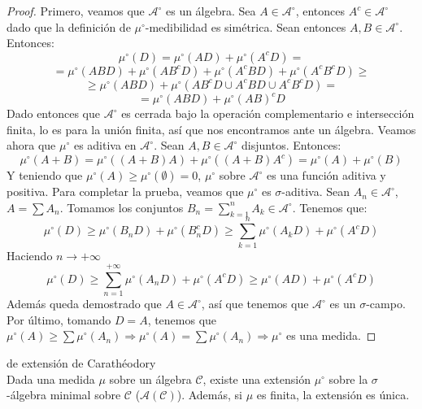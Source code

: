 \begin{proof}
Primero, veamos que $\mathcal{A}^\circ$ es un álgebra. Sea $A \in \mathcal{A}^\circ$, entonces $A^c \in \mathcal{A}^\circ$ dado que la definición de $\mu^\circ$-medibilidad es simétrica. Sean entonces $A,B \in \mathcal{A}^\circ$. Entonces:
$$ \mu^\circ(D) = \mu^\circ(AD) + \mu^\circ(A^cD) = $$
$$ = \mu^\circ(ABD) + \mu^\circ(AB^cD) + \mu^\circ(A^cBD) + \mu^\circ(A^cB^cD) \geq$$
$$ \geq \mu^\circ(ABD) + \mu^\circ (AB^cD \cup A^cBD \cup A^cB^cD) =$$
$$ = \mu^\circ(ABD) + \mu^\circ(AB)^cD$$
Dado entonces que $\mathcal{A}^\circ$ es cerrada bajo la operación complementario e intersección finita, lo es para la unión finita, así que nos encontramos ante un álgebra. Veamos ahora que $\mu^\circ$ es aditiva en $\mathcal{A}^\circ$. Sean $A,B \in \mathcal{A}^\circ$ disjuntos. Entonces:
$$\mu^\circ(A+B) = \mu^\circ((A+B)A) + \mu^\circ((A+B)A^c) = \mu^\circ(A) + \mu^\circ(B)$$
Y teniendo que $\mu^\circ(A) \geq \mu^\circ(\emptyset) = 0$, $\mu^\circ$ sobre $\mathcal{A}^\circ$ es una función aditiva y positiva. Para completar la prueba, veamos que $\mu^\circ$ es $\sigma$-aditiva. Sean $A_n \in \mathcal{A}^\circ$, $A = \displaystyle \sum A_n$. Tomamos los conjuntos $B_n = \displaystyle \sum_{k=1}^n A_k \in \mathcal{A}^\circ$. Tenemos que:
$$ \mu^\circ(D) \geq \mu^\circ (B_nD) + \mu^\circ (B_n^cD) \geq \sum_{k=1}^n\mu^\circ(A_kD) + \mu^\circ(A^cD) $$
Haciendo $n \to +\infty$
$$\mu^\circ(D) \geq \sum_{n=1}^{+\infty} \mu^\circ(A_nD) + \mu^\circ(A^cD) \geq \mu^\circ(AD) + \mu^\circ(A^cD)$$
Además queda demostrado que $A \in \mathcal{A}^\circ$, así que tenemos que $\mathcal{A}^\circ$ es un $\sigma$-campo.
Por último, tomando $D = A$, tenemos que $\mu^\circ(A) \geq \displaystyle \sum \mu^\circ(A_n) \Rightarrow \mu^\circ(A) = \sum \mu^\circ(A_n) \Rightarrow \mu^\circ$ es una medida.


\end{proof}

\begin{theorem}
de extensión de Carathéodory\\
Dada una medida $\mu$ sobre un álgebra $\mathcal{C}$, existe una extensión $\mu^\circ$ sobre la $\sigma$-álgebra minimal sobre $\mathcal{C}$ ($\mathcal{A}(\mathcal{C})$). Además, si $\mu$ es finita, la extensión es única.
\end{theorem}

